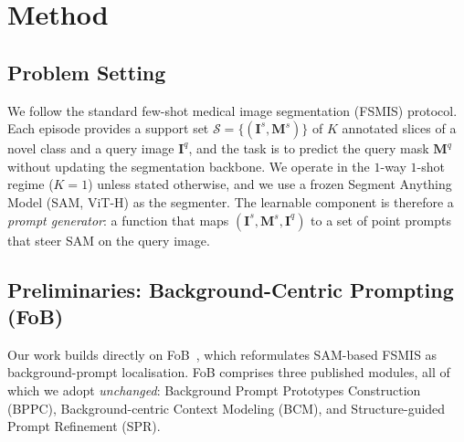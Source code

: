 %

\section{Method}
\label{sec:method}

\subsection{Problem Setting}
\label{subsec:setting}

We follow the standard few-shot medical image segmentation (FSMIS) protocol.
Each episode provides a support set $\mathcal{S}=\{(\mathbf{I}^{s},\mathbf{M}^{s})\}$
of $K$ annotated slices of a novel class and a query image $\mathbf{I}^{q}$, and the
task is to predict the query mask $\mathbf{M}^{q}$ without updating the segmentation
backbone. We operate in the $1$-way $1$-shot regime ($K{=}1$) unless stated
otherwise, and we use a frozen Segment Anything Model (SAM, ViT-H) as the
segmenter. The learnable component is therefore a \emph{prompt generator}: a
function that maps $(\mathbf{I}^{s},\mathbf{M}^{s},\mathbf{I}^{q})$ to a set of
point prompts that steer SAM on the query image.

\subsection{Preliminaries: Background-Centric Prompting (FoB)}
\label{subsec:fob}

Our work builds directly on FoB~\cite{bo2026fob}, which reformulates SAM-based
FSMIS as background-prompt localisation. FoB comprises three published modules,
all of which we adopt \emph{unchanged}: Background Prompt Prototypes
Construction (BPPC), Background-centric Context Modeling (BCM), and
Structure-guided Prompt Refinement (SPR).

